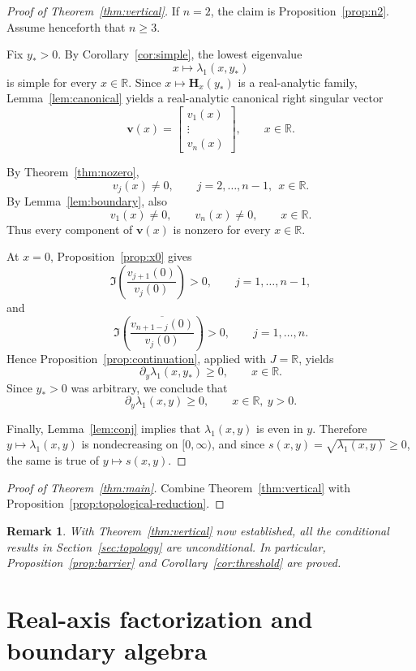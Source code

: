 \documentclass[11pt]{article}
\numberwithin{equation}{section}
\newtheorem{remark}[theorem]{Remark}
\newcommand{\R}{\mathbb R}
\newcommand{\Hmat}{\mathbf H}
\begin{document}
\begin{proof}[Proof of Theorem~\ref{thm:vertical}]
If \(n=2\), the claim is Proposition~\ref{prop:n2}.  Assume henceforth that
\(n\ge3\).

Fix \(y_*>0\).  By Corollary~\ref{cor:simple}, the lowest eigenvalue
\[
x\longmapsto \lambda_1(x,y_*)
\]
is simple for every \(x\in\R\).  Since \(x\mapsto \Hmat_x(y_*)\) is a real-analytic
family, Lemma~\ref{lem:canonical} yields a real-analytic canonical right singular
vector
\[
\bm v(x)=
\begin{bmatrix}
v_1(x)\\
\vdots\\
v_n(x)
\end{bmatrix},
\qquad
x\in\R.
\]

By Theorem~\ref{thm:nozero},
\[
v_j(x)\neq0,
\qquad
j=2,\dots,n-1,\ \ x\in\R.
\]
By Lemma~\ref{lem:boundary}, also
\[
v_1(x)\neq0,
\qquad
v_n(x)\neq0,
\qquad
x\in\R.
\]
Thus every component of \(\bm v(x)\) is nonzero for every \(x\in\R\).

At \(x=0\), Proposition~\ref{prop:x0} gives
\[
\Im\!\left(\frac{v_{j+1}(0)}{v_j(0)}\right)>0,
\qquad
j=1,\dots,n-1,
\]
and
\[
\Im\!\left(\frac{\overline{v_{n+1-j}(0)}}{v_j(0)}\right)>0,
\qquad
j=1,\dots,n.
\]
Hence Proposition~\ref{prop:continuation}, applied with \(J=\R\), yields
\[
\partial_y\lambda_1(x,y_*)\ge0,
\qquad
x\in\R.
\]
Since \(y_*>0\) was arbitrary, we conclude that
\[
\partial_y\lambda_1(x,y)\ge0,
\qquad
x\in\R,\ y>0.
\]

Finally, Lemma~\ref{lem:conj} implies that \(\lambda_1(x,y)\) is even in \(y\).
Therefore \(y\mapsto \lambda_1(x,y)\) is nondecreasing on \([0,\infty)\), and since
\(s(x,y)=\sqrt{\lambda_1(x,y)}\ge0\), the same is true of \(y\mapsto s(x,y)\).
\end{proof}

\begin{proof}[Proof of Theorem~\ref{thm:main}]
Combine Theorem~\ref{thm:vertical} with
Proposition~\ref{prop:topological-reduction}.
\end{proof}

\begin{remark}
With Theorem~\ref{thm:vertical} now established, all the conditional results in
Section~\ref{sec:topology} are unconditional.  In particular,
Proposition~\ref{prop:barrier} and Corollary~\ref{cor:threshold} are proved.
\end{remark}

\appendix

\section{Real-axis factorization and boundary algebra}
\label{app:factor}
\end{document}
